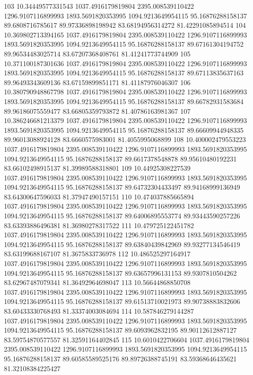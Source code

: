 {103 10.34449577331543 1037.4916179819804 2395.008539110422 1296.9107116899993 1893.5691820353995 1094.9213649954115 95.16876288158137 89.6808716785617 89.97336898198942 83.68194956314272 81.42291085894514
104 10.369802713394165 1037.4916179819804 2395.008539110422 1296.9107116899993 1893.5691820353995 1094.9213649954115 95.16876288158137 89.67161304194752 89.96534483025714 83.67207368408761 81.41241773744909
105 10.371100187301636 1037.4916179819804 2395.008539110422 1296.9107116899993 1893.5691820353995 1094.9213649954115 95.16876288158137 89.67113835637163 89.96493343609136 83.67159899851171 81.41187976046307
106 10.380790948867798 1037.4916179819804 2395.008539110422 1296.9107116899993 1893.5691820353995 1094.9213649954115 95.16876288158137 89.66782931583684 89.96186075559477 83.66805359793872 81.40786163981367
107 10.386246681213379 1037.4916179819804 2395.008539110422 1296.9107116899993 1893.5691820353995 1094.9213649954115 95.16876288158137 89.66609944948335 89.96013088924128 83.6660575983001 81.4055995068899
108 10.400002479553223 1037.4916179819804 2395.008539110422 1296.9107116899993 1893.5691820353995 1094.9213649954115 95.16876288158137 89.6617378548878 89.95610480192231 83.66102498915137 81.39989588318801
109 10.44925308227539 1037.4916179819804 2395.008539110422 1296.9107116899993 1893.5691820353995 1094.9213649954115 95.16876288158137 89.64732304433497 89.94168999136949 83.64300647596033 81.37947490157151
110 10.474037885665894 1037.4916179819804 2395.008539110422 1296.9107116899993 1893.5691820353995 1094.9213649954115 95.16876288158137 89.64006895553774 89.93443590257226 83.63393886496381 81.36980278317522
111 10.479725122451782 1037.4916179819804 2395.008539110422 1296.9107116899993 1893.5691820353995 1094.9213649954115 95.16876288158137 89.63840439842969 89.93277134546419 83.63199688167107 81.3675833736978
112 10.486525297164917 1037.4916179819804 2395.008539110422 1296.9107116899993 1893.5691820353995 1094.9213649954115 95.16876288158137 89.63657996131153 89.9307810504262 83.62967487079341 81.36492964698047
113 10.56644868850708 1037.4916179819804 2395.008539110422 1296.9107116899993 1893.5691820353995 1094.9213649954115 95.16876288158137 89.61513710021973 89.90738883832606 83.60433330768493 81.33374003084694
114 10.587846279144287 1037.4916179819804 2395.008539110422 1296.9107116899993 1893.5691820353995 1094.9213649954115 95.16876288158137 89.6093962832195 89.90112612887127 83.59754870577557 81.32591164402845
115 10.6010422706604 1037.4916179819804 2395.008539110422 1296.9107116899993 1893.5691820353995 1094.9213649954115 95.16876288158137 89.60585589525176 89.89726388745191 83.59368646435621 81.32108384225427
}
